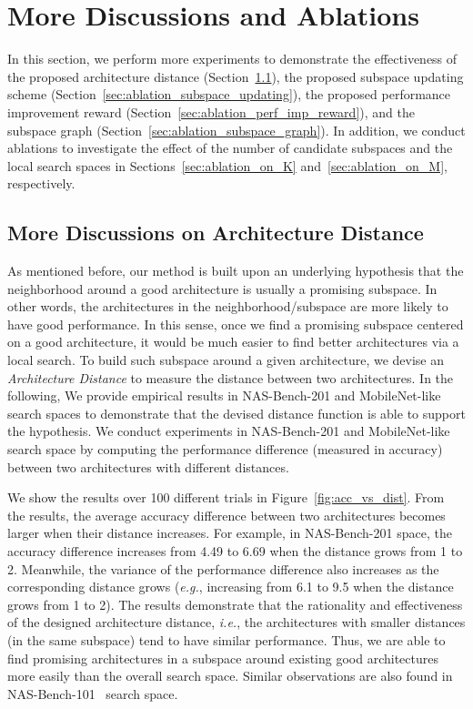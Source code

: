 \documentclass[lettersize,journal]{IEEEtran}
\def\eg{\emph{e.g.}} \def\Eg{\emph{E.g.}}
\def\ie{\emph{i.e.}} \def\Ie{\emph{I.e.}}
\begin{document}
\section{More Discussions and Ablations}

In this section, we perform more experiments to  demonstrate the effectiveness of the proposed architecture distance (Section~\ref{sec:ablation_arch_distance}), the proposed subspace updating scheme (Section~\ref{sec:ablation_subspace_updating}), the proposed performance improvement reward (Section~\ref{sec:ablation_perf_imp_reward}), and the subspace graph (Section~\ref{sec:ablation_subspace_graph}).
In addition, we conduct ablations to investigate the effect of the number of candidate subspaces  and the local search spaces in Sections~\ref{sec:ablation_on_K} and~\ref{sec:ablation_on_M}, respectively.

\subsection{More Discussions on Architecture Distance}\label{sec:ablation_arch_distance}

As mentioned before, our method is built upon an underlying hypothesis that the neighborhood around a good architecture is usually a promising subspace.
In other words, the architectures in the neighborhood/subspace are more likely to have good performance.
In this sense, once we find a promising subspace centered on a good architecture, it would be much easier to find better architectures via a local search.
To build such subspace around a given architecture, we devise an \textit{Architecture Distance}  to measure the distance between two architectures.
In the following, We provide empirical results in  NAS-Bench-201 and MobileNet-like search spaces to demonstrate that the devised distance function is able to support the hypothesis.
We conduct experiments in NAS-Bench-201 and MobileNet-like search space by computing the performance difference (measured in accuracy) between two architectures with different distances.

We show the results over 100 different trials in Figure~\ref{fig:acc_vs_dist}.
From the results, the average accuracy difference between two architectures becomes larger when their distance increases.
For example, in NAS-Bench-201 space, the accuracy difference increases from 4.49 to 6.69 when the distance grows from 1 to 2.
Meanwhile, the variance of the performance difference also increases as the corresponding distance grows (\eg, increasing from 6.1 to 9.5 when the distance grows from 1 to 2).
The results demonstrate that the rationality and effectiveness of the designed architecture distance, \ie, the architectures with smaller distances (in the same subspace) tend to have similar performance.
Thus, we are able to find promising architectures in a subspace around existing good architectures more easily than the overall search space.
Similar observations are also found in NAS-Bench-101~\cite{ying2019bench} search space.
\end{document}
